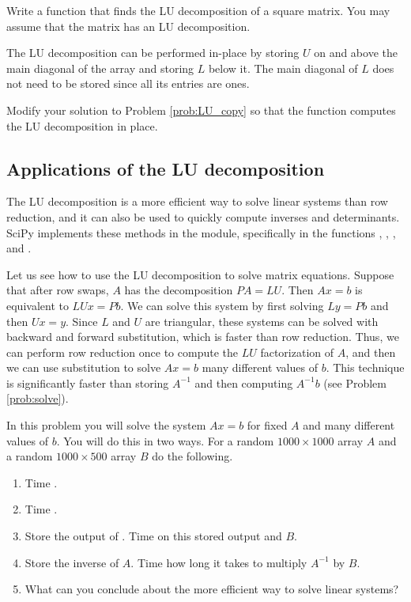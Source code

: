 \begin{problem}
\label{prob:LU_copy}
Write a function that finds the LU decomposition of a square matrix. 
You may assume that the matrix has an LU decomposition.
\end{problem}

The LU decomposition can be performed in-place by storing $U$ on and above the main diagonal of the array and storing $L$ below it.
The main diagonal of $L$ does not need to be stored since all its entries are ones.


\begin{problem}[Optional]
Modify your solution to Problem \ref{prob:LU_copy} so that the function computes the LU decomposition in place.
\end{problem}



\subsection*{Applications of the LU decomposition}
The LU decomposition is a more efficient way to solve linear systems than row reduction, and it can also be used to quickly compute inverses and determinants. 
SciPy implements these methods in the  module, specifically in the functions , , , and .

Let us see how to use the LU decomposition to solve matrix equations. 
Suppose that after row swaps, $A$ has the decomposition $PA = LU$. 
Then $Ax=b$ is equivalent to $LUx=Pb$. 
We can solve this system by first solving $Ly = Pb$ and then $Ux = y$. 
Since $L$ and $U$ are triangular, these systems can be solved with backward and forward substitution, which is faster than row reduction. 
Thus, we can perform row reduction once to compute the $LU$ factorization of $A$, and then we can use substitution to solve $Ax=b$ many different values of $b$. 
This technique is significantly faster than storing $A^{-1}$ and then computing $A^{-1}b$ (see Problem \ref{prob:solve}).

\begin{problem}\label{prob:solve}
In this problem you will solve the system $Ax = b$ for fixed $A$ and many different values of $b$. 
You will do this in two ways. 
For a random $1000 \times 1000$ array $A$ and a random $1000 \times 500$ array $B$ do the following.
\begin{enumerate}
\item Time .
\item Time .
\item Store the output of . Time  on this stored output and $B$.
\item Store the inverse of $A$. Time how long it takes to multiply $A^{-1}$ by $B$.
\item What can you conclude about the more efficient way to solve linear systems?
\end{enumerate}
\end{problem}


